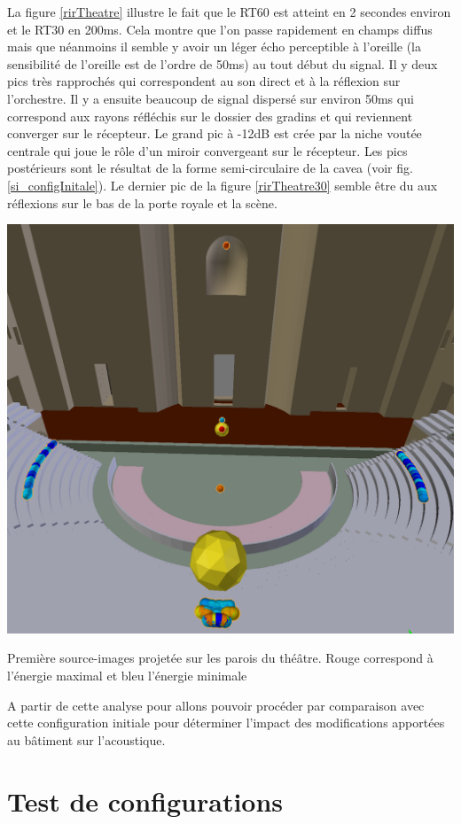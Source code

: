 La figure \ref{rirTheatre} illustre le fait que le \gls{RT60} est atteint en 2 secondes environ et le RT30 en 200ms. Cela montre que l'on passe rapidement en champs diffus mais que néanmoins il semble y avoir un léger écho perceptible à l'oreille (la sensibilité de l'oreille est de l'ordre de 50ms) au tout début du signal. Il y deux pics très rapprochés qui correspondent au son direct et à la réflexion sur l'orchestre. Il y a ensuite beaucoup de signal dispersé sur environ 50ms qui correspond aux rayons réfléchis sur le dossier des gradins et qui reviennent converger sur le récepteur. Le grand pic à -12dB est crée par la niche voutée centrale qui joue le rôle d'un miroir convergeant sur le récepteur. Les pics postérieurs sont le résultat de la forme semi-circulaire de la \gls{cavea} (voir fig. \ref{si_configInitale}). Le dernier pic de la figure \ref{rirTheatre30} semble être du aux réflexions sur le bas de la porte royale et la scène. 

\begin{figureth}
	\includegraphics[width=0.8\linewidth]{images/si_configInitale}
	\caption{Première source-images projetée sur les parois du théâtre. Rouge correspond à l'énergie maximal et bleu l'énergie minimale}
	\label{si_configInitale}
\end{figureth}

A partir de cette analyse pour allons pouvoir procéder par comparaison avec cette configuration initiale pour déterminer l'impact des modifications apportées au bâtiment sur l'acoustique.
		
	\chapter{Test de configurations}
		\minitoc
		\newpage
	
